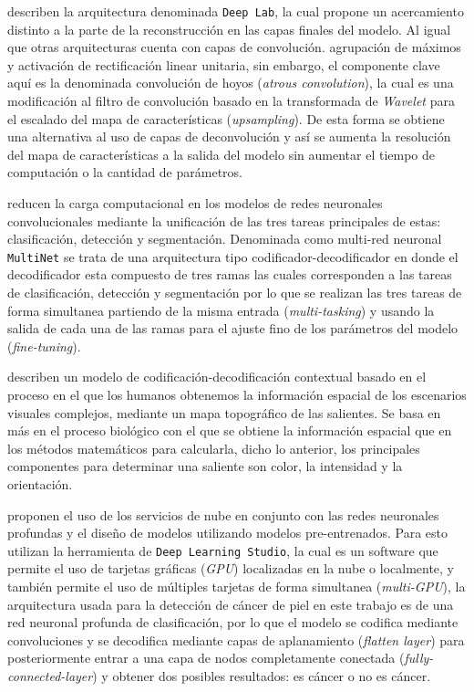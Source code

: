 \citet{DBLP:journals/corr/ChenPK0Y16} describen la arquitectura denominada \texttt{Deep Lab}, la cual propone un acercamiento distinto a la parte de la reconstrucción en las capas finales del modelo. Al igual que otras arquitecturas cuenta con capas de convolución. agrupación de máximos y activación de rectificación linear unitaria, sin embargo, el componente clave aquí es la denominada convolución de hoyos (\emph{atrous convolution}), la cual es una modificación al filtro de convolución basado en la transformada de \emph{Wavelet} para el escalado del mapa de características (\emph{upsampling}). De esta forma se obtiene una alternativa al uso de capas de deconvolución y así se aumenta la resolución del mapa de características a la salida del modelo sin aumentar el tiempo de computación o la cantidad de parámetros.

\citet{DBLP:journals/corr/TeichmannWZCU16} reducen la carga computacional en los modelos de redes neuronales convolucionales mediante la unificación de las tres tareas principales de estas: clasificación, detección y segmentación. Denominada como multi-red neuronal \texttt{MultiNet} se trata de una arquitectura tipo codificador-decodificador en donde el decodificador esta compuesto de tres ramas las cuales corresponden a las tareas de clasificación, detección y segmentación por lo que se realizan las tres tareas de forma simultanea partiendo de la misma entrada (\emph{multi-tasking}) y usando la salida de cada una de las ramas para el ajuste fino de los parámetros del modelo (\emph{fine-tuning}).  

\citet{KRONER2020261} describen un modelo de codificación-decodificación contextual basado en el proceso en el que los humanos obtenemos la información espacial de los escenarios visuales complejos, mediante un mapa topográfico de las salientes. Se basa en más en el proceso biológico con el que se obtiene la información espacial que en los métodos matemáticos para calcularla, dicho lo anterior, los principales componentes para determinar una saliente son color, la intensidad y la orientación.  

\citet{KADAMPUR2020100282} proponen el uso de los servicios de nube en conjunto con las redes neuronales profundas y el diseño de modelos utilizando modelos pre-entrenados. Para esto utilizan la herramienta de \texttt{Deep Learning Studio}, la cual es un software que permite el uso de tarjetas gráficas (\emph{GPU}) localizadas en la nube o localmente, y también permite el uso de múltiples tarjetas de forma simultanea (\emph{multi-GPU}), la arquitectura usada para la detección de cáncer de piel en este trabajo es de una red neuronal profunda de clasificación, por lo que el modelo se codifica mediante convoluciones y se decodifica mediante capas de aplanamiento (\emph{flatten layer}) para posteriormente entrar a una capa de nodos completamente conectada (\emph{fully-connected-layer}) y obtener dos posibles resultados: es cáncer o no es cáncer.

